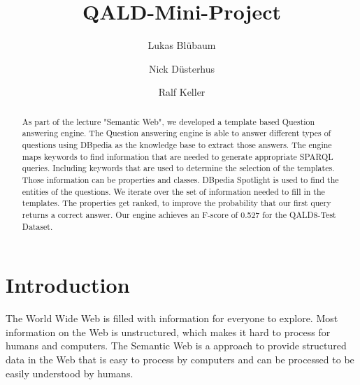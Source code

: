 \documentclass[runningheads]{llncs}
\begin{document}
%
\title{QALD-Mini-Project}
%
\newcommand\tab[1][1cm]{\hspace*{#1}}
\author{Lukas Bl{\"u}baum \and
Nick D{\"u}sterhus \and
Ralf Keller}
%
%



%
\maketitle              %
%
\begin{abstract}
As part of the lecture "Semantic Web", we developed a template based Question answering engine. The Question answering engine is able to answer different types of questions using DBpedia as the knowledge base to extract those answers.
The engine maps keywords to find information that are needed to generate appropriate SPARQL queries. Including keywords that are used to determine the selection of the templates.
Those information can be properties and classes. DBpedia Spotlight is used to find the entities of the questions.
We iterate over the set of information needed to fill in the templates.
The properties get ranked, to improve the probability that our first query returns a correct answer.
Our engine achieves an F-score of 0.527 for the QALD8-Test Dataset.

\end{abstract}
%
%
%
\section{Introduction}  

The World Wide Web is filled with information for everyone to explore. Most information on the Web is unstructured, which makes it hard to process for humans and computers. The Semantic Web is a approach to provide structured data in the Web that is easy to process by computers and can be processed to be easily understood by humans. \\
\end{document}
